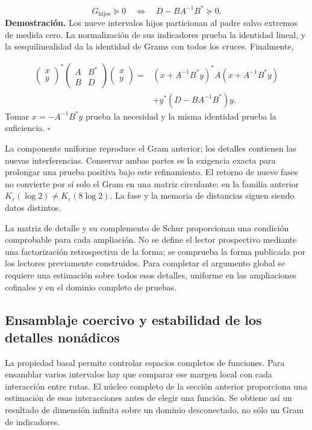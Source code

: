 \[
G_{\mathrm{hijos}}\succeq0
\quad\Longleftrightarrow\quad D-BA^{-1}B^*\succeq0.
\]
\textbf{Demostración.} Los nueve intervalos hijos particionan al padre salvo extremos de medida cero. La normalización de sus indicadores prueba la identidad lineal, y la sesquilinealidad da la identidad de Grams con todos los cruces. Finalmente,

\[
\begin{aligned}
\begin{pmatrix}x\\y\end{pmatrix}^*
\begin{pmatrix}A&B^*\\B&D\end{pmatrix}
\begin{pmatrix}x\\y\end{pmatrix}
={}&(x+A^{-1}B^*y)^*A(x+A^{-1}B^*y)\\
&+y^*(D-BA^{-1}B^*)y.
\end{aligned}
\]
Tomar \(x=-A^{-1}B^*y\) prueba la necesidad y la misma identidad prueba la suficiencia. \hfill\(\square\)

La componente uniforme reproduce el Gram anterior; los detalles contienen las nuevas interferencias. Conservar ambas partes es la exigencia exacta para prolongar una prueba positiva bajo este refinamiento. El retorno de nueve fases no convierte por sí solo el Gram en una matriz circulante: en la familia anterior \(K_\varepsilon(\log2)\neq K_\varepsilon(8\log2)\). La fase y la memoria de distancias siguen siendo datos distintos.

La matriz de detalle y su complemento de Schur proporcionan una condición comprobable para cada ampliación. No se define el lector prospectivo mediante una factorización retrospectiva de la forma; se comprueba la forma publicada por los lectores previamente construidos. Para completar el argumento global se requiere una estimación sobre todos esos detalles, uniforme en las ampliaciones cofinales y en el dominio completo de pruebas.

\subsection{Ensamblaje coercivo y estabilidad de los detalles nonádicos}
La propiedad basal permite controlar espacios completos de funciones. Para ensamblar varios intervalos hay que comparar ese margen local con cada interacción entre rutas. El núcleo completo de la sección anterior proporciona una estimación de esas interacciones antes de elegir una función. Se obtiene así un resultado de dimensión infinita sobre un dominio desconectado, no sólo un Gram de indicadores.


